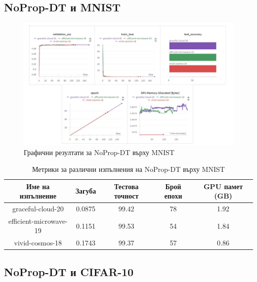 \documentclass[a4paper,11pt]{article}
\begin{document}
\subsection{NoProp-DT и MNIST}

\begin{figure}[H]
    \centering
    \includegraphics[width=6.26in,keepaspectratio]{images/NoProp-DT MNIST.jpg}
    \caption{Графични резултати за NoProp-DT върху MNIST}
\end{figure}

\begin{table}[H]
  \centering
  \renewcommand{\arraystretch}{1.5} %
  \begin{tabular}{ccccc}
    \toprule
    \textbf{Име на изпълнение} & \textbf{Загуба} & \textbf{Тестова точност} & \textbf{Брой епохи} & \textbf{GPU памет (GB)}\\
    \midrule
    graceful-cloud-20 & 0.0875 & 99.42 & 78 & 1.92\\
    efficient-microwave-19 & 0.1151 & 99.53 & 54 & 1.84\\
    vivid-cosmos-18& 0.1743& 99.37& 57& 0.86\\

    \bottomrule
  \end{tabular}
  \caption{Метрики за различни изпълнения на NoProp-DT върху MNIST}
  \label{tab:avg_metrics_noprop_dt_mnist}
\end{table}

\subsection{NoProp-DT и CIFAR-10}
\end{document}
